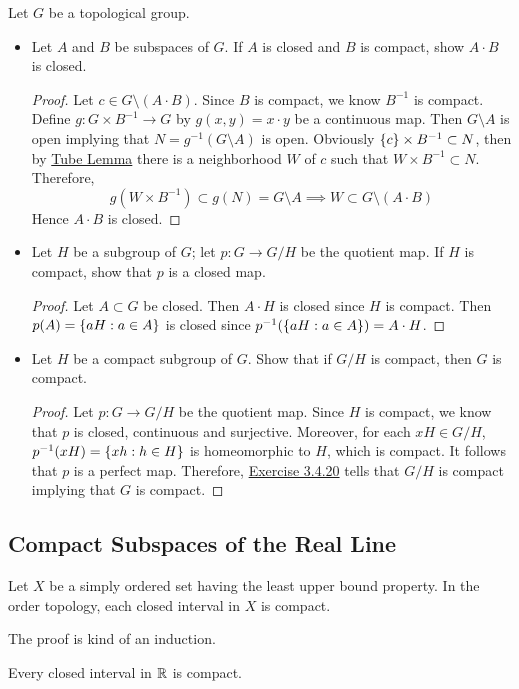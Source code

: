 \documentclass[12pt,a4paper]{article}
\begin{document}
    \begin{ex}
        Let $G$ be a topological group.
        \begin{itemize}
            \item Let $A$ and $B$ be subspaces of $G$. If $A$ is closed and $B$ is compact, show $A\cdot B$ is closed.
            \begin{proof}
                Let $c\in G\setminus (A\cdot B)$. Since $B$ is compact, we know $B^{-1}$ is compact. Define $g:G\times B^{-1}\to G$ by $g(x,y)=x\cdot y$ be a continuous map. Then $G\setminus A$ is open implying that $N=g^{-1}(G\setminus A)$ is open. Obviously $\left\{c\right\}\times B^{-1}\subset N$, then by \hyperref[3.4.9]{Tube Lemma} there is a neighborhood $W$ of $c$ such that $W\times B^{-1}\subset N$. Therefore,
                $$
                g(W\times B^{-1})\subset g(N)=G\setminus A\implies W\subset G\setminus (A\cdot B)
                $$
                Hence $A\cdot B$ is closed.
            \end{proof}
            \item Let $H$ be a subgroup of $G$; let $p:G\to G/H$ be the quotient map. If $H$ is compact, show that $p$ is a closed map.
            \begin{proof}
                Let $A\subset G$ be closed. Then $A\cdot H$ is closed since $H$ is compact. Then $p(A)=\left\{aH:a\in A\right\}$ is closed since $p^{-1}(\left\{aH:a\in A\right\})=A\cdot H$.
            \end{proof}
            \item Let $H$ be a compact subgroup of $G$. Show that if $G/H$ is compact, then $G$ is compact.
            \begin{proof}
                Let $p:G\to G/H$ be the quotient map. Since $H$ is compact, we know that $p$ is closed, continuous and surjective. Moreover, for each $xH\in G/H$, $p^{-1}(xH)=\left\{xh:h\in H\right\}$ is homeomorphic to $H$, which is compact. It follows that $p$ is a perfect map. Therefore, \hyperref[3.4.20]{Exercise 3.4.20} tells that $G/H$ is compact implying that $G$ is compact.
            \end{proof}
        \end{itemize}
    \end{ex}
    \hfill

    \subsection{Compact Subspaces of the Real Line}
    \begin{thm}
        Let $X$ be a simply ordered set having the least upper bound property. In the order topology, each closed interval in $X$ is compact.
    \end{thm}
    \begin{remark}
        The proof is kind of an induction.
    \end{remark}
    \begin{cor}
        Every closed interval in $\mathbb{R}$ is compact.
    \end{cor}
    \hfill
    
\end{document}
